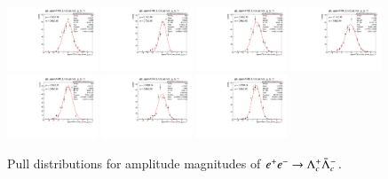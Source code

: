 \begin{figure}[h]
    \includegraphics[width=0.24\textwidth]{figure/io_wo_bkg/gls/pull_gls_epem4700_Lmdc.aLmdc_g_ls_1r.pdf}
    \includegraphics[width=0.24\textwidth]{figure/io_wo_bkg/gls/pull_gls_epem4740_Lmdc.aLmdc_g_ls_1r.pdf}
    \includegraphics[width=0.24\textwidth]{figure/io_wo_bkg/gls/pull_gls_epem4750_Lmdc.aLmdc_g_ls_1r.pdf}
    \includegraphics[width=0.24\textwidth]{figure/io_wo_bkg/gls/pull_gls_epem4780_Lmdc.aLmdc_g_ls_1r.pdf}
    \includegraphics[width=0.24\textwidth]{figure/io_wo_bkg/gls/pull_gls_epem4840_Lmdc.aLmdc_g_ls_1r.pdf}
    \includegraphics[width=0.24\textwidth]{figure/io_wo_bkg/gls/pull_gls_epem4914_Lmdc.aLmdc_g_ls_1r.pdf}
    \includegraphics[width=0.24\textwidth]{figure/io_wo_bkg/gls/pull_gls_epem4946_Lmdc.aLmdc_g_ls_1r.pdf}
    \caption{Pull distributions for amplitude magnitudes of $e^+e^-\rightarrow\Lambda_{c}^{+}\bar{\Lambda}_{c}^{-}$.}
\label{fig:io_wo_bkg_pull_magnitudes}
\end{figure}

